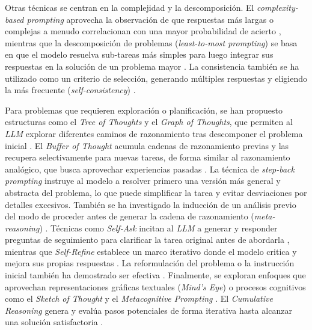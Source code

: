 Otras técnicas se centran en la complejidad y la descomposición. El \textit{complexity-based prompting} aprovecha la observación de que respuestas más largas o complejas a menudo correlacionan con una mayor probabilidad de acierto \parencite{fuComplexityBasedPromptingMultiStep2023}, mientras que la descomposición de problemas (\textit{least-to-most prompting}) se basa en que el modelo resuelva sub-tareas más simples para luego integrar sus respuestas en la solución de un problema mayor \parencite{zhouLeasttoMostPromptingEnables2023}. La consistencia también se ha utilizado como un criterio de selección, generando múltiples respuestas y eligiendo la más frecuente (\textit{self-consistency}) \parencite{wangSelfConsistencyImprovesChain2023}.

Para problemas que requieren exploración o planificación, se han propuesto estructuras como el \textit{Tree of Thoughts} y el \textit{Graph of Thoughts}, que permiten al \textit{LLM} explorar diferentes caminos de razonamiento tras descomponer el problema inicial \parencite{yaoTreeThoughtsDeliberate2023, bestaGraphThoughtsSolving2024}. El \textit{Buffer of Thought} \parencite{yangBufferThoughtsThoughtAugmented2024} acumula cadenas de razonamiento previas y las recupera selectivamente para nuevas tareas, de forma similar al razonamiento analógico, que busca aprovechar experiencias pasadas \parencite{yasunagaLargeLanguageModels2024}. La técnica de \textit{step-back prompting}\parencite{zhengTakeStepBack2024} instruye al modelo a resolver primero una versión más general y abstracta del problema, lo que puede simplificar la tarea y evitar desviaciones por detalles excesivos. También se ha investigado la inducción de un análisis previo del modo de proceder antes de generar la cadena de razonamiento (\textit{meta-reasoning}) \parencite{gaoMetaReasoningLarge2024}. Técnicas como \textit{Self-Ask} incitan al \textit{LLM} a generar y responder preguntas de seguimiento para clarificar la tarea original antes de abordarla \parencite{pressMeasuringNarrowingCompositionality2023}, mientras que \textit{Self-Refine} establece un marco iterativo donde el modelo critica y mejora sus propias respuestas \parencite{madaanSelfRefineIterativeRefinement2023}. La reformulación del problema o la instrucción inicial también ha demostrado ser efectiva \parencite{mishraReframingInstructionalPrompts2022, dengRephraseRespondLet2024}. Finalmente, se exploran enfoques que aprovechan representaciones gráficas textuales (\textit{Mind's Eye}) \parencite{wuMindsEyeLLMs2024} o procesos cognitivos como el \textit{Sketch of Thought} \parencite{aytesSketchofThoughtEfficientLLM2025} y el \textit{Metacognitive Prompting} \parencite{wangMetacognitivePromptingImproves2024}. El \textit{Cumulative Reasoning} genera y evalúa pasos potenciales de forma iterativa hasta alcanzar una solución satisfactoria \parencite{zhangCumulativeReasoningLarge2025}.

